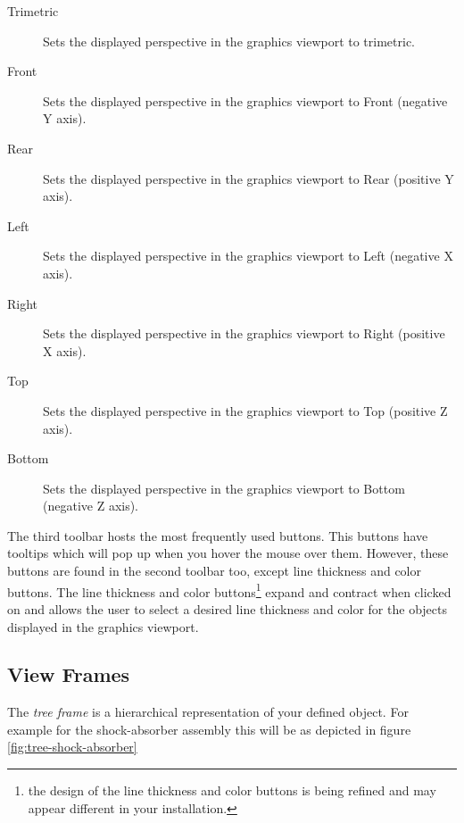 \documentclass [11pt]{book}
\begin{document}
\begin{itemize}
\begin{description}
\item [Trimetric]
Sets the displayed perspective in the graphics viewport to trimetric.

\item [Front]
Sets the displayed perspective in the graphics viewport to Front (negative Y axis).

\item [Rear]
Sets the displayed perspective in the graphics viewport to Rear (positive Y axis).

\item [Left]
Sets the displayed perspective in the graphics viewport to Left (negative X axis).

\item [Right]
Sets the displayed perspective in the graphics viewport to Right (positive X axis).

\item [Top]
Sets the displayed perspective in the graphics viewport to Top (positive Z axis).

\item [Bottom]
Sets the displayed perspective in the graphics viewport to Bottom (negative Z axis).

\end{description}



\end{itemize}



The third toolbar hosts the most frequently used buttons. This
buttons have tooltips which will pop up when you hover the mouse over
them. However, these buttons are found in the second toolbar too,
except line thickness and color buttons. The line thickness and color
buttons\footnote{the design of the line thickness and color buttons is
being refined and may appear different in your installation.} expand and contract when clicked on and allows the user to
select a desired line thickness and color for the objects displayed in
the graphics viewport.



\subsection{View Frames}

\label{subsec:viewframes}



The \emph{tree frame} is a hierarchical representation of your defined
object. For example for the shock-absorber assembly this will be as
depicted in figure 
\ref{fig:tree-shock-absorber}
\end{document}
